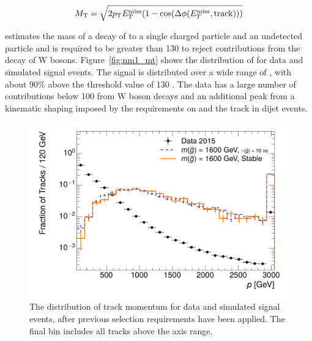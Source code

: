 \begin{equation}
 M_{\mathrm{T}} = \sqrt{2 p_{\mathrm{T}} E_T^{\mathrm{miss}} (1-\cos(\Delta\phi (E_T^{\mathrm{miss}},\mathrm{track})) ) }
\end{equation}

\noindent estimates the mass of a decay of to a single charged particle and an undetected particle and is required to be greater than 130 \GeV to reject contributions from the decay of W bosons.
Figure~\ref{fig:nm1_mt} shows the distribution of \mt for data and simulated signal events.
The signal is distributed over a wide range of \mt, with about 90\% above the threshold value of 130 \GeV. 
The data has a large number of contributions below 100 \GeV from W boson decays and an additional peak from a kinematic shaping imposed by the requirements on \met and the track \pt in dijet events.

\begin{figure}[h]
\centering
\includegraphics[width=\fullfig]{figures/selection_p_nm1.pdf}
\caption{The distribution of track momentum for data and simulated signal events, after previous selection requirements have been applied. The final bin includes all tracks above the axis range.}
\label{fig:nm1_p}
\end{figure}


